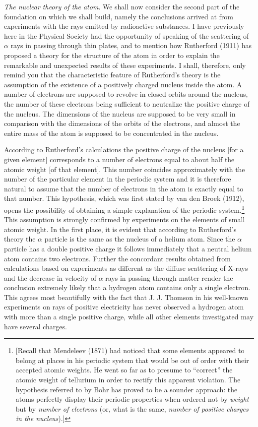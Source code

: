 \emph{The nuclear theory of the atom}. We shall now consider the second
part of the foundation on which we shall build, namely the conclusions
arrived at from experiments with the rays emitted by radioactive
substances. I have previously here in the Physical Society had the
opportunity of speaking of the scattering of $\alpha$ rays in passing
through thin plates, and to mention how Rutherford (1911) has proposed a
theory for the structure of the atom in order to explain the remarkable
and unexpected results of these experiments. I shall, therefore, only
remind you that the characteristic feature of Rutherford's theory is the
assumption of the existence of a positively charged nucleus inside the
atom. A number of electrons are supposed to revolve in closed orbits
around the nucleus, the number of these electrons being sufficient to
neutralize the positive charge of the nucleus. The dimensions of the
nucleus are supposed to be very small in comparison with the dimensions
of the orbits of the electrons, and almost the entire mass of the atom
is supposed to be concentrated in the nucleus.

According to Rutherford's calculations the positive charge of the
nucleus {[}for a given element{]} corresponds to a number of electrons
equal to about half the atomic weight {[}of that element{]}. This number
coincides approximately with the number of the particular element in the
periodic system and it is therefore natural to assume that the number of
electrons in the atom is exactly equal to that number. This hypothesis,
which was first stated by van den Broek (1912), opens the possibility of
obtaining a simple explanation of the periodic system.\footnote{{[}Recall
  that Mendeleev (1871) had noticed that some elements appeared to
  belong at places in his periodic system that would be out of order
  with their accepted atomic weights. He went so far as to presume to
  ``correct'' the atomic weight of tellurium in order to rectify this
  apparent violation. The hypothesis referred to by Bohr has proved to
  be a sounder approach: the atoms perfectly display their periodic
  properties when ordered not by \emph{weight} but by \emph{number of
  electrons} (or, what is the same, \emph{number of positive charges in
  the nucleus}).{]}} This assumption is strongly confirmed by
experiments on the elements of small atomic weight. In the first place,
it is evident that according to Rutherford's theory the $\alpha$
particle is the same as the nucleus of a helium atom. Since the $\alpha$
particle has a double positive charge it follows immediately that a
neutral helium atom contains two electrons. Further the concordant
results obtained from calculations based on experiments as different as
the diffuse scattering of X-rays and the decrease in velocity of
$\alpha$ rays in passing through matter render the conclusion extremely
likely that a hydrogen atom contains only a single electron. This agrees
most beautifully with the fact that J. J. Thomson in his well-known
experiments on rays of positive electricity has never observed a
hydrogen atom with more than a single positive charge, while all other
elements investigated may have several charges.

